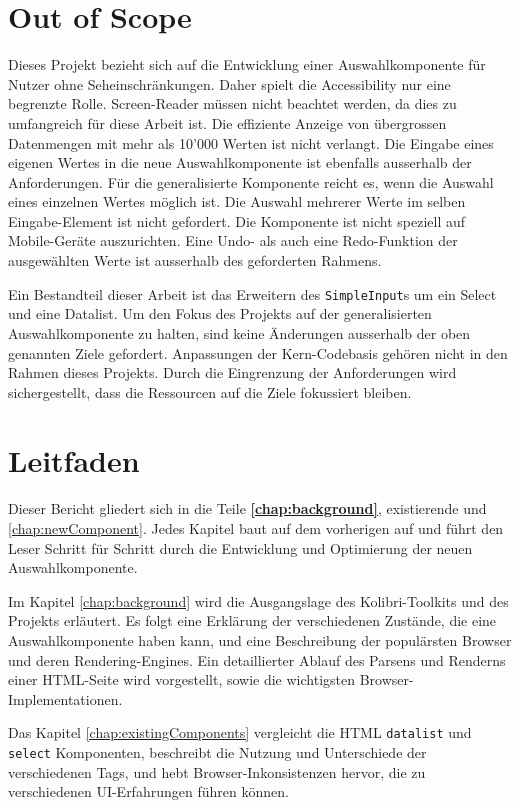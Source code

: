 \section{Out of Scope}
\label{sec:outOfScope}

Dieses Projekt bezieht sich auf die Entwicklung einer Auswahlkomponente für Nutzer ohne Seheinschränkungen.
Daher spielt die Accessibility nur eine begrenzte Rolle.
Screen-Reader müssen nicht beachtet werden, da dies zu umfangreich für diese Arbeit ist.
Die effiziente Anzeige von übergrossen Datenmengen mit mehr als 10'000 Werten ist nicht verlangt.
Die Eingabe eines eigenen Wertes in die neue Auswahlkomponente ist ebenfalls ausserhalb der Anforderungen.
Für die generalisierte Komponente reicht es, wenn die Auswahl eines einzelnen Wertes möglich ist.
Die Auswahl mehrerer Werte im selben Eingabe-Element ist nicht gefordert.
Die Komponente ist nicht speziell auf Mobile-Geräte auszurichten. 
Eine Undo- als auch eine Redo-Funktion der ausgewählten Werte ist ausserhalb des geforderten Rahmens. 

Ein Bestandteil dieser Arbeit ist das Erweitern des \texttt{SimpleInput}s um ein Select und eine Datalist.
Um den Fokus des Projekts auf der generalisierten Auswahlkomponente zu halten, sind keine Änderungen ausserhalb der oben genannten Ziele gefordert.
Anpassungen der Kern-Codebasis gehören nicht in den Rahmen dieses Projekts.
Durch die Eingrenzung der Anforderungen wird sichergestellt, dass die Ressourcen auf die Ziele fokussiert bleiben.

\section{Leitfaden}
\label{sec:tocTexted}

Dieser Bericht gliedert sich in die Teile \textbf{\ref{chap:background}}, existierende und \ref{chap:newComponent}.
Jedes Kapitel baut auf dem vorherigen auf und führt den Leser Schritt für Schritt durch die Entwicklung und Optimierung der neuen Auswahlkomponente.

Im Kapitel \ref{chap:background} wird die Ausgangslage des Kolibri-Toolkits und des Projekts erläutert.
Es folgt eine Erklärung der verschiedenen Zustände, die eine Auswahlkomponente haben kann, und eine Beschreibung der populärsten Browser und deren Rendering-Engines.
Ein detaillierter Ablauf des Parsens und Renderns einer HTML-Seite wird vorgestellt, sowie die wichtigsten Browser-Implementationen.

Das Kapitel \ref{chap:existingComponents} vergleicht die HTML \texttt{datalist} und \texttt{select} Komponenten, beschreibt die Nutzung und Unterschiede der verschiedenen Tags, 
und hebt Browser-Inkonsistenzen hervor, die zu verschiedenen UI-Erfahrungen führen können.

